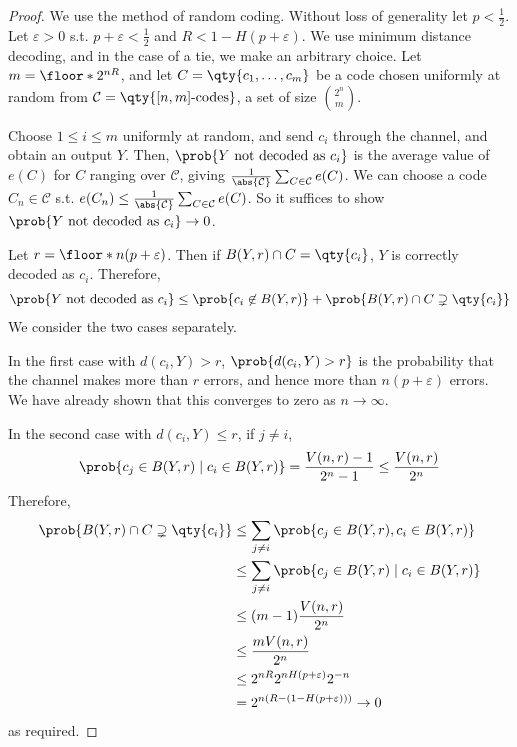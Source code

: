 \begin{proof}
    We use the method of random coding.
    Without loss of generality let $p < \frac{1}{2}$.
    Let $\varepsilon > 0$ s.t. $p + \varepsilon < \frac{1}{2}$ and $R < 1 - H(p + \varepsilon)$.
    We use minimum distance decoding, and in the case of a tie, we make an arbitrary choice.
    Let $m = \floor*{2^{nR}}$, and let $C = \qty{c_1, \dots, c_m}$ be a code chosen uniformly at random from $\mathcal C = \qty{[n,m]\text{-codes}}$, a set of size $\binom{2^n}{m}$.

    Choose $1 \leq i \leq m$ uniformly at random, and send $c_i$ through the channel, and obtain an output $Y$.
    Then, $\prob{Y \text{ not decoded as } c_i}$ is the average value of $e(C)$ for $C$ ranging over $\mathcal C$, giving $\frac{1}{\abs{\mathcal C}} \sum_{C \in \mathcal C} e(C)$.
    We can choose a code $C_n \in \mathcal C$ s.t. $e(C_n) \leq \frac{1}{\abs{\mathcal C}}\sum_{C \in \mathcal C} e(C)$.
    So it suffices to show $\prob{Y \text{ not decoded as } c_i} \to 0$.

    Let $r = \floor*{n(p + \varepsilon)}$.
    Then if $B(Y,r) \cap C = \qty{c_i}$, $Y$ is correctly decoded as $c_i$.
    Therefore,
    \begin{align*}
        \prob{Y \text{ not decoded as } c_i} \leq \prob{c_i \not\in B(Y,r)} + \prob{B(Y,r) \cap C \supsetneq \qty{c_i}}
    \end{align*}
    We consider the two cases separately.

    In the first case with $d(c_i,Y) > r$, $\prob{d(c_i,Y) > r}$ is the probability that the channel makes more than $r$ errors, and hence more than $n(p + \varepsilon)$ errors.
    We have already shown that this converges to zero as $n \to \infty$.

    In the second case with $d(c_i,Y) \leq r$, if $j \neq i$,
    \begin{align*}
        \prob{c_j \in B(Y,r) \mid c_i \in B(Y,r)} = \frac{V(n,r) - 1}{2^n - 1} \leq \frac{V(n,r)}{2^n}
    \end{align*}
    Therefore,
    \begin{align*}
        \prob{B(Y,r) \cap C \supsetneq \qty{c_i}} &\leq \sum_{j \neq i} \prob{c_j \in B(Y,r), c_i \in B(Y,r)} \\
        &\leq \sum_{j \neq i} \prob{c_j \in B(Y,r) \mid c_i \in B(Y,r)} \\
        &\leq (m-1) \frac{V(n,r)}{2^n} \\
        &\leq \frac{mV(n,r)}{2^n} \\
        &\leq 2^{nR} 2^{nH(p+\varepsilon)} 2^{-n} \\
        &= 2^{n(R - (1 - H(p+\varepsilon)))} \to 0
    \end{align*}
    as required.
\end{proof}

